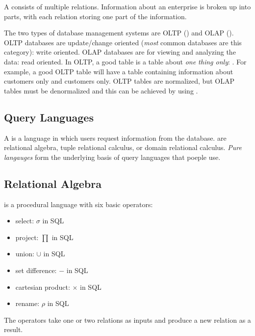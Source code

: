 \documentclass{article}
\begin{document}
A  consists of multiple relations. Information about an enterprise is broken up into parts, with each relation storing one part of the information. 

The two types of database management systems are OLTP () and OLAP (). OLTP databases are update/change oriented (\emph{most} common databases are this category): write oriented. OLAP databases are for viewing and analyzing the data: read oriented. In OLTP, a good table is a table about \emph{one thing only}: . For example, a good OLTP table will have a table containing information about customers only and customers only. OLTP tables are normalized, but OLAP tables must be denormalized and this can be achieved by using . 

\subsection{Query Languages}

A  is a language in which users request information from the database.  are relational algebra, tuple relational calculus, or domain relational calculus. \emph{Pure langauges} form the underlying basis of query languages that poeple use. 

\subsection{Relational Algebra}

 is a procedural language with six basic operators:
\begin{itemize}
  \item select: $\sigma$ \hfill {} in SQL
  \item project: $\prod$ \hfill {} in SQL
  \item union: $\cup$ \hfill {} in SQL
  \item set difference: $-$ \hfill {} in SQL
  \item cartesian product: $\times$ \hfill {} in SQL
  \item rename: $\rho$ \hfill {} in SQL
\end{itemize}
The operators take one or two relations as inputs and produce a new relation as a result. 
\end{document}
